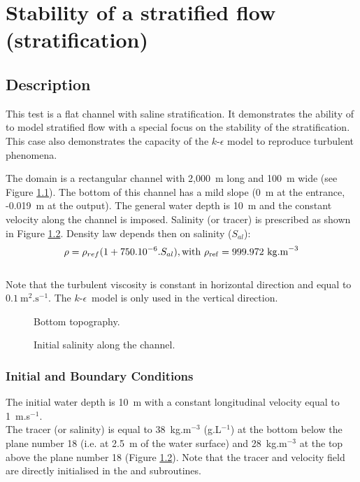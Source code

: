 \chapter{Stability of a stratified flow (stratification)}

\section{Description}
\bigskip
This test is a flat channel with saline stratification.
It demonstrates the ability of  to model stratified
flow with a special focus on the stability of the stratification.
This case also demonstrates the capacity of the $k$-$\epsilon$ model
to reproduce turbulent phenomena.

\bigskip
The domain is a rectangular channel with 2,000~m long and 100~m wide 
(see Figure \ref{t3d:stratification:fig:bathy}). The bottom of 
this channel has a mild slope (0~m at the entrance, -0.019~m at the output).
The general water depth is 10~m and the constant velocity 
along the channel is imposed. Salinity (or tracer) is prescribed 
as shown in Figure \ref{t3d:stratification:fig:salInit}.
Density law depends then on salinity ($S_{al}$):
\begin{equation*}
\rho = \rho_{ref} (1 + 750.10^{-6} . S_{al} ),
\rm{with }~\rho_{ref} = 999.972~\rm{kg.m}^{-3}
\end{equation*}
\\
Note that the turbulent viscosity is constant in horizontal direction
and equal to $0.1~\text{m}^2.\text{s}^{-1}$. The $k$-$\epsilon$~model 
is only used in the vertical direction. 

\begin{figure}[!htbp]
 \centering
 \caption{Bottom topography.}
 \label{t3d:stratification:fig:bathy}
\end{figure}
\begin{figure}[!htbp]
 \centering
 \caption{Initial salinity along the channel.}
 \label{t3d:stratification:fig:salInit}
\end{figure}

\subsection{Initial and Boundary Conditions}
\bigskip
The initial water depth is 10~m with a constant longitudinal 
velocity equal to 1~m.s$^{-1}$.\\
The tracer (or salinity) is equal to 38~kg.m$^{-3}$ (g.L$^{-1}$)
at the bottom below the plane number 18 
(i.e. at 2.5~m of the water surface) and 28~kg.m$^{-3}$ 
at the top above the plane number 18 
(Figure \ref{t3d:stratification:fig:salInit}).
Note that the tracer and velocity field are directly initialised in the
 and  subroutines.


